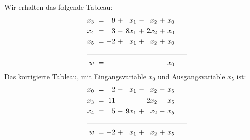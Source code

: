 \documentclass [a4paper,11pt]{article}
\begin{document}
\begin{enumerate}
        \newpage

        Wir erhalten das folgende Tableau:
        \begin{align*}
        \begin{alignedat}{6}
        && x_3 &\ = &\  9 &\ + &\  x_1 &\ - &\  x_2 &\ + &\ x_0 \\
        && x_4 &\ = &\  3 &\ - &\ 8x_1 &\ + &\ 2x_2 &\ + &\ x_0 \\
        && x_5 &\ = &\ -2 &\ + &\  x_1 &\ + &\  x_2 &\ + &\ x_0 \\
        &\rlap{\rule{5cm}{.1pt}} &&&&&&&&&\\
        && w   &\ = &     &    &       &    &       &\ - &\ x_0
        \end{alignedat}
        \end{align*}
        Das korrigierte Tableau, mit Eingangsvariable $x_0$ und Ausgangsvariable $x_5$ ist:
        \begin{align*}
        \begin{alignedat}{6}
        && x_0 &\ = &\  2 &\ - &\  x_1 &\ - &\  x_2 &\ - &\ x_5 \\
        && x_3 &\ = &\ 11 &    &       &\ - &\ 2x_2 &\ - &\ x_5 \\
        && x_4 &\ = &\  5 &\ - &\ 9x_1 &\ + &\  x_2 &\ - &\ x_5 \\
        &\rlap{\rule{5cm}{.1pt}} &&&&&&&&&\\
        && w   &\ = &\ -2 &\ + &\  x_1 &\ + &\  x_2 &\ + &\ x_5
        \end{alignedat}
        \end{align*}


\end{enumerate}
\end{document}
